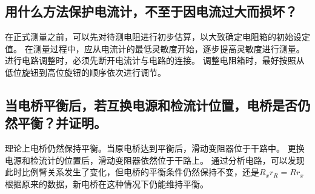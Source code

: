\documentclass[signature=data]{physicsreport}
\begin{document}
\subsection{用什么方法保护电流计，不至于因电流过大而损坏？}

在正式测量之前，可以先对待测电阻进行初步估算，以大致确定电阻箱的初始设定值。
在测量过程中，应从电流计的最低灵敏度开始，逐步提高灵敏度进行测量。
进行电路调整时，必须先断开电流计与电路的连接。
调整电阻箱时，最好按照从低位旋钮到高位旋钮的顺序依次进行调节。

\subsection{当电桥平衡后，若互换电源和检流计位置，电桥是否仍然平衡？并证明。}

理论上电桥仍然保持平衡。当原电桥达到平衡后，滑动变阻器位于干路中。
更换电源和检流计的位置后，滑动变阻器依然位于干路上。
通过分析电路，可以发现此时比例臂关系发生了变化，但电桥的平衡条件仍然保持不变，还是$R_xr_R=Rr_x$
根据原来的数据，新电桥在这种情况下仍能维持平衡。
\end{document}

